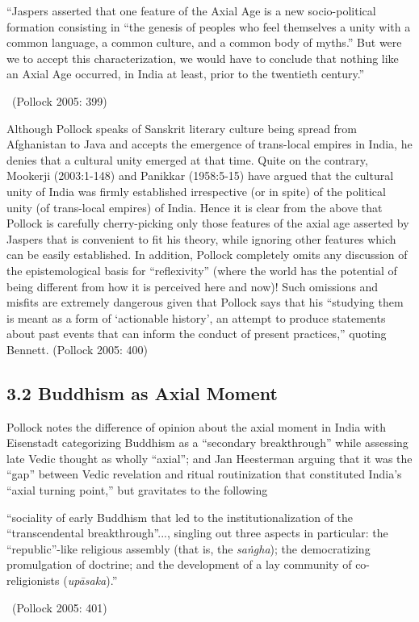 \begin{myquote}
“Jaspers asserted that one feature of the Axial Age is a new socio-political formation consisting in “the genesis of peoples who feel themselves a unity with a common language, a common culture, and a common body of myths.” But were we to accept this characterization, we would have to conclude that nothing like an Axial Age occurred, in India at least, prior to the twentieth century.” 

~\hfill (Pollock 2005: 399)
\end{myquote}

Although Pollock speaks of Sanskrit literary culture being spread from Afghanistan to Java and accepts the emergence of trans-local empires in India, he denies that a cultural unity emerged at that time. Quite on the contrary, Mookerji (2003:1-148) and Panikkar (1958:5-15) have argued that the cultural unity of India was firmly established irrespective (or in spite) of the political unity (of trans-local empires) of India. Hence it is clear from the above that Pollock is carefully cherry-picking only those features of the axial age asserted by Jaspers that is convenient to fit his theory, while ignoring other features which can be easily established. In addition, Pollock completely omits any discussion of the epistemological basis for “reflexivity” (where the world has the potential of being different from how it is perceived here and now)! Such omissions and misfits are extremely dangerous given that Pollock says that his “studying them is meant as a form of ‘actionable history’, an attempt to produce statements about past events that can inform the conduct of present practices,” quoting Bennett. (Pollock 2005: 400)


\subsection*{3.2 Buddhism as Axial Moment}

Pollock notes the difference of opinion about the axial moment in India with Eisenstadt categorizing Buddhism as a “secondary breakthrough” while assessing late Vedic thought as wholly “axial”; and Jan Heesterman arguing that it was the “gap” between Vedic revelation and ritual routinization that constituted India’s “axial turning point,” but gravitates to the following

\begin{myquote}
“sociality of early Buddhism that led to the institutionalization of the “transcendental breakthrough”..., singling out three aspects in particular: the “republic”-like religious assembly (that is, the \textit{saṅgha}); the democratizing promulgation of doctrine; and the development of a lay community of co-religionists (\textit{upāsaka}).” 

~\hfill (Pollock 2005: 401)
\end{myquote}


